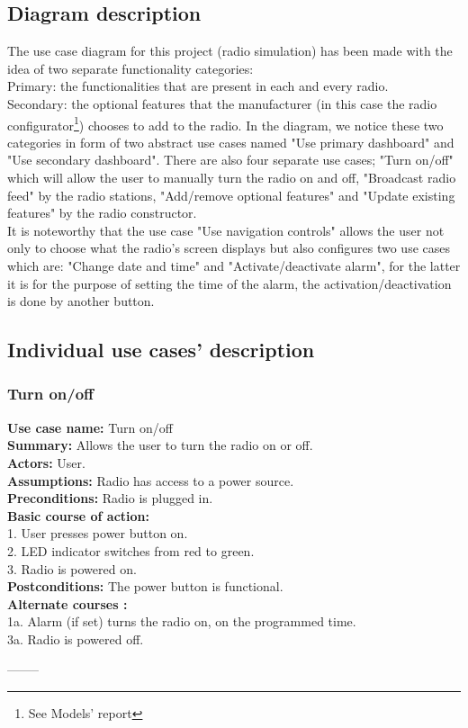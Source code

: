 \documentclass[11pt]{article}
\begin{document}
\subsection{Diagram description}
The use case diagram for this project (radio simulation) has been made with the idea of two separate functionality categories:\\
Primary: the functionalities that are present in each and every radio.\\
Secondary: the optional features that the manufacturer (in this case the radio configurator\footnote{See Models' report}) chooses to add to the radio.
In the diagram, we notice these two categories in form of two abstract use cases named "Use primary dashboard" and "Use secondary dashboard". There are also four separate use cases; "Turn on/off" which will allow the user to manually turn the radio on and off, "Broadcast radio feed" by the radio stations, "Add/remove optional features" and "Update existing features" by the radio constructor.\\
It is noteworthy that the use case "Use navigation controls" allows the user not only to choose what the radio's screen displays but also configures two use cases which are: "Change date and time" and "Activate/deactivate alarm", for the latter it is for the purpose of setting the time of the alarm, the activation/deactivation is done by another button.

\subsection{Individual use cases' description}
\subsubsection{Turn on/off}
\textbf{Use case name:} Turn on/off\\
\textbf{Summary:} Allows the user to turn the radio on or off.\\
\textbf{Actors:} User.\\
\textbf{Assumptions:} Radio has access to a power source.\\
\textbf{Preconditions:} Radio is plugged in.\\
\textbf{Basic course of action:}\\
\hspace*{10mm}1. User presses power button on.\\
\hspace*{10mm}2. LED indicator switches from red to green.\\
\hspace*{10mm}3. Radio is powered on.\\
\textbf{Postconditions: }The power button is functional.\\
\textbf{Alternate courses :}\\
\hspace*{10mm}1a. Alarm (if set) turns the radio on, on the programmed time.\\ 
\hspace*{10mm}3a. Radio is powered off.
\begin{center}--------\end{center}
\end{document}
